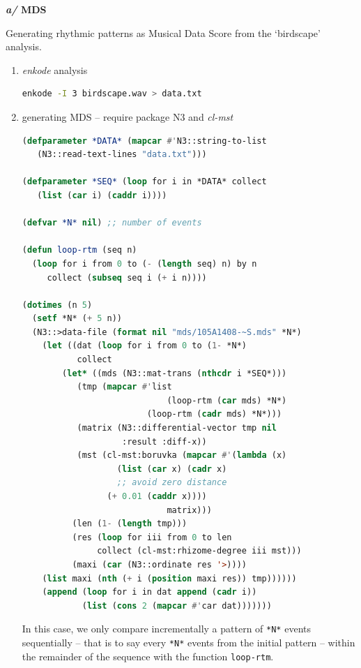   \textbf{\textit{a/} MDS }
  
  \smallskip
  Generating rhythmic patterns as Musical Data Score from the `birdscape' analysis.
  
 \begin{enumerate}
\item \textsl{enkode} analysis
 
\begin{lstlisting}[basicstyle=\footnotesize\ttfamily,language=Bash]
enkode -I 3 birdscape.wav > data.txt
\end{lstlisting}

\item generating MDS -- require package N3 and \textsl{cl-mst}
\begin{lstlisting}[basicstyle=\footnotesize\ttfamily,language=Lisp]
(defparameter *DATA* (mapcar #'N3::string-to-list 
   (N3::read-text-lines "data.txt")))

(defparameter *SEQ* (loop for i in *DATA* collect 
   (list (car i) (caddr i))))

(defvar *N* nil) ;; number of events

(defun loop-rtm (seq n)
  (loop for i from 0 to (- (length seq) n) by n 
     collect (subseq seq i (+ i n))))
     
(dotimes (n 5)
  (setf *N* (+ 5 n))
  (N3::>data-file (format nil "mds/105A1408-~S.mds" *N*) 
    (let ((dat (loop for i from 0 to (1- *N*) 
           collect
        (let* ((mds (N3::mat-trans (nthcdr i *SEQ*)))
	       (tmp (mapcar #'list 
	                         (loop-rtm (car mds) *N*) 
		                 (loop-rtm (cadr mds) *N*)))
	       (matrix (N3::differential-vector tmp nil 
				    :result :diff-x))
	       (mst (cl-mst:boruvka (mapcar #'(lambda (x) 
			       (list (car x) (cadr x) 
			       ;; avoid zero distance
				 (+ 0.01 (caddr x)))) 
				             matrix)))
	      (len (1- (length tmp)))
	      (res (loop for iii from 0 to len 
	           collect (cl-mst:rhizome-degree iii mst)))
	      (maxi (car (N3::ordinate res '>))))
    (list maxi (nth (+ i (position maxi res)) tmp))))))
	(append (loop for i in dat append (cadr i)) 
	        (list (cons 2 (mapcar #'car dat)))))))
\end{lstlisting}
In this case, we only compare incrementally a pattern of \texttt{*N*} events sequentially -- that is to say every  \texttt{*N*} events from the initial pattern -- within the remainder of the sequence with the function \texttt{loop-rtm}.
\end{enumerate}

